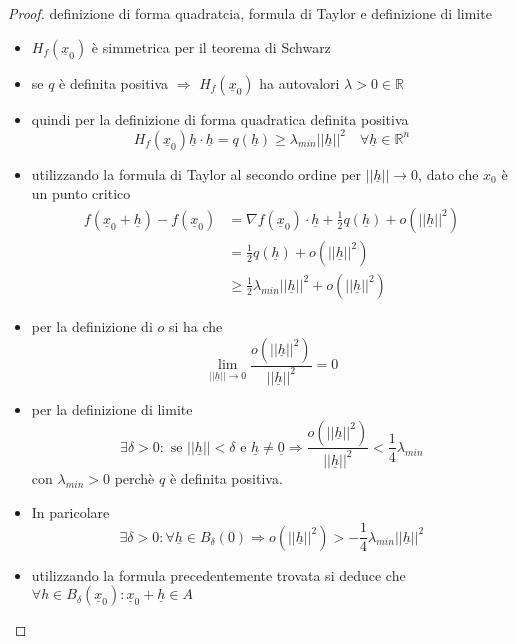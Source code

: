 \documentclass[12pt, a4paper]{article}
\theoremstyle{break}
\begin{document}
\begin{proof} definizione di forma quadratcia, formula di Taylor e definizione
	di limite
	\begin{itemize}
		\item $H_f(\underline{x}_0)$ è simmetrica per il teorema di Schwarz
		\item se $q$ è definita positiva $\Rightarrow$ $H_f(\underline{x}_0)$ ha
		      autovalori $\lambda > 0 \in \mathbb{R}$
		\item quindi per la definizione di forma quadratica definita positiva
		      \[
			      H_f(\underline{x}_0) \underline{h} \cdot \underline{h} = q
			      (\underline{h}) \geq \lambda_{min} ||\underline{h}||^2
			      \quad \forall \underline{h} \in \mathbb{R}^n
		      \]
		\item utilizzando la formula di Taylor al secondo ordine per
		      $||\underline{h}|| \to 0$, dato che $x_0$ è un punto critico
		      \begin{align*}
			      f(\underline{x}_0 + \underline{h}) - f(\underline{x}_0) & =
			      \nabla f(\underline{x}_0) \cdot \underline{h} + \frac{1}{2}
			      q(\underline{h}) + o(||\underline{h}||^2)
			      \\ & = \frac{1}{2} q(\underline{h})+ o(||\underline{h}||^2)
			      \\ & \geq \frac{1}{2} \lambda_{min} ||\underline{h}||^2 +
			      o(||\underline{h}||^2)
		      \end{align*}
		\item per la definizione di $o$ si ha che
		      \[
			      \lim_{||\underline{h}|| \to 0} \frac{o(||\underline{h}||^2)}
			      {||\underline{h}||^2} = 0
		      \]
		\item per la definizione di limite
		      \[
			      \exists \delta > 0 : \text{ se } ||\underline{h}|| < \delta
			      \text{ e } \underline{h} \neq \underline{0} \Rightarrow
			      \frac{o(||\underline{h}||^2)} {||\underline{h}||^2} <
			      \frac{1}{4}\lambda_{min}
		      \]
		      con $\lambda_{min} > 0$ perchè $q$ è definita positiva.\\
		\item In paricolare
		      \[
			      \exists \delta > 0 : \forall \underline{h} \in B_{\delta}(0)
			      \Rightarrow o(||\underline{h}||^2) > -\frac{1}{4}\lambda_{min}
			      ||\underline{h}||^2
		      \]
		\item utilizzando la formula precedentemente trovata si deduce che
		      $\forall h \in B_{\delta}(\underline{x}_0): \underline{x}_0 +
			      \underline{h} \in A$

\end{itemize}
\end{proof}
\end{document}
